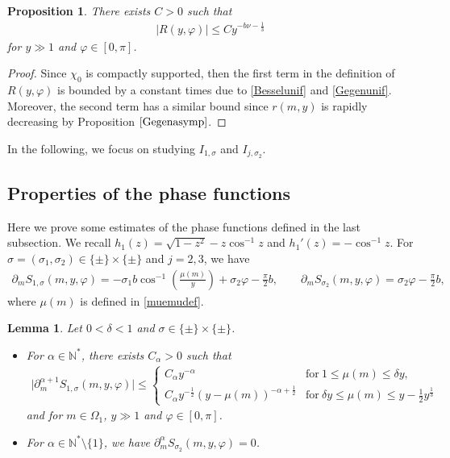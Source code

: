 \documentclass[pdftex]{sigma}
\numberwithin{equation}{section}
\newtheorem{Lemma}[Theorem]{Lemma}
\newtheorem{Proposition}[Theorem]{Proposition}
 { \theoremstyle{definition}
\newtheorem{Definition}[Theorem]{Definition}
\newtheorem{Note}[Theorem]{Note}
\newtheorem{Example}[Theorem]{Example}
\newtheorem{Remark}[Theorem]{Remark} }
\def\d{\,\mathrm{d}}%
\def\a{\alpha}
\def\d{\delta}
\def\f{\varphi}
\def\m{\mu}
\def\n{\nu}
\def\s{\sigma}
\def\pa{\partial}
\begin{document}
\begin{Proposition}\label{Ryphiprop}
There exists $C>0$ such that
\begin{align*}
|R(y,\f)|\leq Cy^{-b\n-\frac{1}{3}}
\end{align*}
for $y\gg 1$ and $\f\in [0,\pi]$.
\end{Proposition}
\begin{proof}
Since $\chi_0$ is compactly supported, then the first term in the definition of $R(y,\f)$ is bounded by a constant times \smash{$y^{-b\n}\cdot y^{-\frac{1}{3}}=y^{-b\n-\frac{1}{3}}$} due to \eqref{Besselunif} and \eqref{Gegenunif}. Moreover, the second term has a similar bound since $r(m,y)$ is rapidly decreasing by Proposition $\ref{Gegenasymp}$.
\end{proof}

In the following, we focus on studying $I_{1,\s}$ and $I_{j,\s_2}$.

\subsection{Properties of the phase functions}

Here we prove some estimates of the phase functions defined in the last subsection.
We recall $h_1(z)=\sqrt{1-z^2}-z\cos^{-1} z$ and
$
h_1'(z)=-\cos^{-1}z$.
For $\s=(\s_1,\s_2)\in \{\pm\}\times \{\pm\}$ and $j=2,3$, we have
\begin{align*}
\pa_mS_{1,\s}(m,y,\f)=-\s_1 b\cos^{-1}\left(\frac{\m(m)}{y} \right)+\s_2\f-\frac{\pi}{2}b,\qquad \pa_mS_{\s_2}(m,y,\f)=\s_2 \f-\frac{\pi}{2}b,
\end{align*}
where $\m(m)$ is defined in \eqref{muemudef}.

\begin{Lemma}\label{phaseest}
Let $0<\d<1$ and $\s\in \{\pm\}\times \{\pm\}$.
\begin{itemize}\itemsep=0pt
\item[$(i)$] For $\a\in\mathbb{N}^*$, there exists $C_{\a}>0$ such that
\begin{align*}
\big|\pa_m^{\a+1}S_{1,\s}(m,y,\f)\big|\leq \begin{cases}C_{\a}y^{-\a}&  \text{for}\  1\leq \m(m)\leq \d y,\\
C_{\a}y^{-\frac{1}{2}}(y-\m(m))^{-\a+\frac{1}{2}}& \text{for}\  \d y\leq \m(m)\leq y-\frac{1}{2}y^{\frac{1}{3}}
\end{cases}
\end{align*}
and for $m\in \Omega_1$, $y\gg 1$ and $\f\in [0,\pi]$.
\item[$(ii)$] For $\a\in\mathbb{N}^*\setminus \{1\}$, we have $\pa_m^{\a}S_{\s_2}(m,y,\f)=0$.
\end{itemize}
\end{Lemma}
\end{document}
